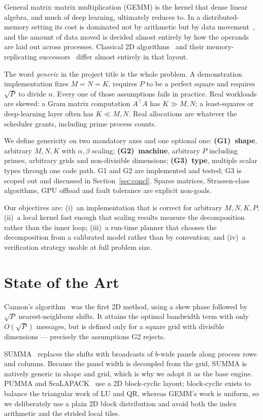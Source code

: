 \documentclass[conference,10pt]{IEEEtran}
\begin{document}
General matrix--matrix multiplication (GEMM) is the kernel that dense linear
algebra, and much of deep learning, ultimately reduces to. In a
distributed-memory setting its cost is dominated not by arithmetic but by data
movement~\cite{irony2004,ballard2011}, and the amount of data moved is decided
almost entirely by how the operands are laid out across processes. Classical
2D algorithms~\cite{cannon1969,summa1997} and their memory-replicating
successors~\cite{solomonik2011} differ almost entirely in that layout.

The word \emph{generic} in the project title is the whole problem. A
demonstration implementation fixes $M=N=K$, requires $P$ to be a perfect square
and requires $\sqrt{P}$ to divide $n$. Every one of those assumptions fails in
practice. Real workloads are skewed: a Gram matrix computation
$A^{\!\top}\!A$ has $K \gg M,N$; a least-squares or deep-learning layer often has
$K \ll M,N$. Real allocations are whatever the scheduler grants, including
prime process counts.

We define genericity on two mandatory axes and one optional one:
\textbf{(G1)~shape}, arbitrary $M,N,K$ with $\alpha,\beta$ scaling;
\textbf{(G2)~machine}, arbitrary $P$ including primes, arbitrary grids and
non-divisible dimensions;
\textbf{(G3)~type}, multiple scalar types through one code path.
G1 and G2 are implemented and tested; G3 is scoped out and discussed in
Section~\ref{sec:concl}. Sparse matrices, Strassen-class algorithms, GPU
offload and fault tolerance are explicit non-goals.

Our objectives are: (i)~an implementation that is correct for arbitrary
$M,N,K,P$; (ii)~a local kernel fast enough that scaling results measure the
decomposition rather than the inner loop; (iii)~a run-time planner that
chooses the decomposition from a calibrated model rather than by convention;
and (iv)~a verification strategy usable at full problem size.

\section{State of the Art}

Cannon's algorithm~\cite{cannon1969} was the first 2D method, using a skew
phase followed by $\sqrt{P}$ nearest-neighbour shifts. It attains the optimal
bandwidth term with only $O(\sqrt{P})$ messages, but is defined only for a
square grid with divisible dimensions --- precisely the assumptions G2 rejects.

SUMMA~\cite{summa1997} replaces the shifts with broadcasts of $b$-wide panels
along process rows and columns. Because the panel width is decoupled from the
grid, SUMMA is natively generic in shape and grid, which is why we adopt it as
the base engine. PUMMA and ScaLAPACK~\cite{scalapack1997} use a 2D
block-cyclic layout; block-cyclic exists to balance the triangular work of LU
and QR, whereas GEMM's work is uniform, so we deliberately use a plain 2D block
distribution and avoid both the index arithmetic and the strided local tiles.
\end{document}
